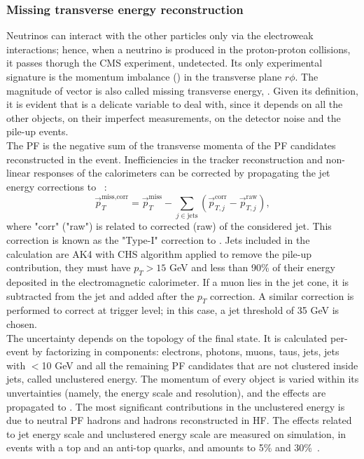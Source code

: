 \subsubsection{Missing transverse energy reconstruction}
Neutrinos can interact with the other particles only via the electroweak interactions; hence, when a neutrino is produced in the proton-proton collisions, it passes thorugh the CMS experiment, undetected. Its only experimental signature is the momentum imbalance (\met) in the transverse plane $r \phi$. The magnitude of \met vector is also called missing transverse energy, \MET. Given its definition, it is evident that \MET is a delicate variable to deal with, since it depends on all the other objects, on their imperfect measurements, on the detector noise and the pile-up events.\\
The PF \MET is the negative sum of the transverse momenta of the PF candidates reconstructed in the event. Inefficiencies in the tracker reconstruction and non-linear responses of the calorimeters can be corrected by propagating the jet energy corrections to \met~\cite{CMS:2016ljj}:
\begin{equation}
\vec{p}_T^{\text{miss,corr}} = \vec{p}_T^{\text{miss}} - \sum_{j \in \text{jets}} \left( \vec{p}_{T,j}^{\text{corr}} - \vec{p}_{T,j}^{\text{raw}}\right),
\label{eq:met_typeI}
\end{equation}
where "corr" ("raw") is related to corrected (raw) \pt of the considered jet. This correction is known as the "Type-I" correction to \MET. Jets included in the calculation are AK4 with CHS algorithm applied to remove the pile-up contribution, they must have $p_T>15$ GeV and less than 90\% of their energy deposited in the electromagnetic calorimeter. If a muon lies in the jet cone, it is subtracted from the jet and added after the $p_T$ correction. A similar correction is performed to correct \met at trigger level; in this case, a jet \pt threshold of 35 GeV is chosen.\\
The \MET uncertainty depends on the topology of the final state. It is calculated per-event by factorizing \met in components: electrons, photons, muons, taus, jets, jets with \pt$<$10 GeV and all the remaining PF candidates that are not clustered inside jets, called unclustered energy. The momentum of every object is varied within its unvertainties (namely, the energy scale and resolution), and the effects are propagated to \met. The most significant contributions in the unclustered energy is due to neutral PF hadrons and hadrons reconstructed in HF. The effects related to jet energy scale and unclustered energy scale are measured on simulation, in events with a top and an anti-top quarks, and amounts to 5\% and 30\%~\cite{CMS:2016ljj}.\\

